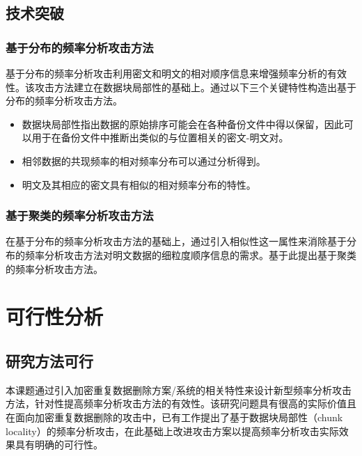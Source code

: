 \subsection{技术突破}

\subsubsection{基于分布的频率分析攻击方法}


\par 基于分布的频率分析攻击利用密文和明文的相对顺序信息来增强频率分析的有效性。该攻击方法建立在数据块局部性的基础上。通过以下三个关键特性构造出基于分布的频率分析攻击方法。

\begin{itemize}
    \item 数据块局部性指出数据的原始排序可能会在各种备份文件中得以保留，因此可以用于在备份文件中推断出类似的与位置相关的密文-明文对。
    \item 相邻数据的共现频率的相对频率分布可以通过分析得到。
    \item 明文及其相应的密文具有相似的相对频率分布的特性。
\end{itemize}
 
\subsubsection{基于聚类的频率分析攻击方法}


在基于分布的频率分析攻击方法的基础上，通过引入相似性这一属性来消除基于分布的频率分析攻击方法对明文数据的细粒度顺序信息的需求。基于此提出基于聚类的频率分析攻击方法。

\section{可行性分析}

\subsection{研究方法可行}

本课题通过引入加密重复数据删除方案/系统的相关特性来设计新型频率分析攻击方法，针对性提高频率分析攻击方法的有效性。该研究问题具有很高的实际价值且在面向加密重复数据删除的攻击中，已有工作提出了基于数据块局部性（chunk locality）的频率分析攻击，在此基础上改进攻击方案以提高频率分析攻击实际效果具有明确的可行性。

